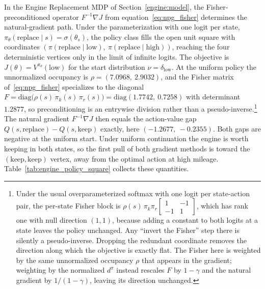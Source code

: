 In the Engine Replacement MDP of Section~\ref{engine:model}, the Fisher-preconditioned operator $F^{-1}\nabla J$ from equation~\eqref{eq:npg_fisher} determines the natural-gradient path. Under the parameterization with one logit per state, $\pi_\theta(\text{replace} \mid s) = \sigma(\theta_s)$, the policy class fills the open unit square with coordinates $(\pi(\text{replace} \mid \text{low}),\ \pi(\text{replace} \mid \text{high}))$, reaching the four deterministic vertices only in the limit of infinite logits. The objective is $J(\theta) = V^{\pi_\theta}(\text{low})$ for the start distribution $\nu = \delta_{\text{low}}$. At the uniform policy the unnormalized occupancy is $\rho = (7.0968,\ 2.9032)$, and the Fisher matrix of~\eqref{eq:npg_fisher} specializes to the diagonal $F = \mathrm{diag}\big(\rho(s)\, \pi_k(s)\, \pi_r(s)\big) = \mathrm{diag}(1.7742,\ 0.7258)$ with determinant $1.2877$, so preconditioning is an entrywise division rather than a pseudo-inverse.\footnote{Under the usual overparameterized softmax with one logit per state-action pair, the per-state Fisher block is $\rho(s)\,\pi_k \pi_r \left[\begin{smallmatrix} 1 & -1 \\ -1 & 1 \end{smallmatrix}\right]$, which has rank one with null direction $(1,1)$, because adding a constant to both logits at a state leaves the policy unchanged. Any ``invert the Fisher'' step there is silently a pseudo-inverse. Dropping the redundant coordinate removes the direction along which the objective is exactly flat. The Fisher here is weighted by the same unnormalized occupancy $\rho$ that appears in the gradient; weighting by the normalized $d^{\pi}$ instead rescales $F$ by $1-\gamma$ and the natural gradient by $1/(1-\gamma)$, leaving its direction unchanged.} The natural gradient $F^{-1} \nabla J$ then equals the action-value gap $Q(s, \text{replace}) - Q(s, \text{keep})$ exactly, here $(-1.2677,\ -0.2355)$. Both gaps are negative at the uniform start. Under uniform continuation the engine is worth keeping in both states, so the first pull of both gradient methods is toward the $(\text{keep}, \text{keep})$ vertex, away from the optimal action at high mileage. Table~\ref{tab:engine_policy_square} collects these quantities.



